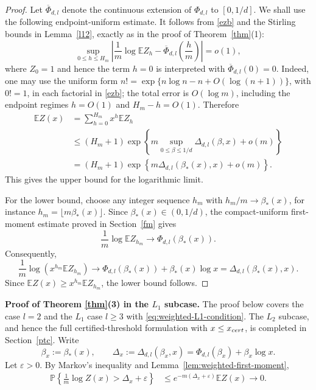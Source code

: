 \documentclass[11pt]{amsart}
\theoremstyle{plain}
\numberwithin{equation}{section}
\numberwithin{theorem}{section}
\numberwithin{figure}{section}
\begin{document}
\begin{proof}
Let $\overline\Phi_{d,l}$ denote the continuous extension of $\Phi_{d,l}$ to
$[0,1/d]$.  We shall use the following endpoint-uniform estimate.  It follows
from \eqref{ezb} and the Stirling bounds in Lemma~\ref{l12}, exactly as in the
proof of Theorem~\ref{thm}(1):
\begin{equation}\label{eq:weighted-crude-first-moment}
  \sup_{0\le h\le H_m}
  \left|
  \frac1m\log \mathbb E Z_h-
  \overline\Phi_{d,l}\left(\frac hm\right)
  \right|=o(1),
\end{equation}
where $Z_0=1$ and hence the term $h=0$ is interpreted with
$\overline\Phi_{d,l}(0)=0$.  Indeed, one may use the uniform form
$n!=\exp\{n\log n-n+O(\log(n+1))\}$, with $0!=1$, in each factorial in
\eqref{ezb}; the total error is $O(\log m)$, including the endpoint regimes
$h=O(1)$ and $H_m-h=O(1)$.  Therefore
\begin{align*}
\mathbb E Z(x)
&=\sum_{h=0}^{H_m}x^h\mathbb E Z_h  \\
&\le (H_m+1)
\exp\left\{m\sup_{0\le\beta\le1/d}
       \Delta_{d,l}(\beta,x)+o(m)\right\}  \\
&=(H_m+1)\exp\left\{m\Delta_{d,l}(\beta_*(x),x)+o(m)\right\} .
\end{align*}
This gives the upper bound for the logarithmic limit.

For the lower bound, choose any integer sequence $h_m$ with
$h_m/m\to\beta_*(x)$, for instance $h_m=\lfloor m\beta_*(x)\rfloor$.
Since $\beta_*(x)\in(0,1/d)$, the compact-uniform first-moment estimate proved
in Section~\ref{fm} gives
\[
  \frac1m\log\mathbb E Z_{h_m}\longrightarrow \Phi_{d,l}(\beta_*(x)).
\]
Consequently,
\[
  \frac1m\log\left(x^{h_m}\mathbb E Z_{h_m}\right)
  \longrightarrow
  \Phi_{d,l}(\beta_*(x))+\beta_*(x)\log x
  =\Delta_{d,l}(\beta_*(x),x).
\]
Since $\mathbb E Z(x)\ge x^{h_m}\mathbb E Z_{h_m}$, the lower bound follows.
\end{proof}

\noindent\textbf{Proof of Theorem \ref{thm}(3) in the $L_1$ subcase.}
The proof below covers the case $l=2$ and the $L_1$ case $l\ge3$ with
\eqref{eq:weighted-L1-condition}.  The $L_2$ subcase, and hence the full
certified-threshold formulation with $x\le x_{\rm cert}$, is completed in
Section~\ref{ptc}.  Write
\[
  \beta_x:=\beta_*(x),\qquad
  \Delta_x:=\Delta_{d,l}(\beta_x,x)
  =\Phi_{d,l}(\beta_x)+\beta_x\log x .
\]
Let $\varepsilon>0$.  By Markov's inequality and Lemma~\ref{lem:weighted-first-moment},
\begin{align}\label{eq:weighted-upper-tail}
\mathbb P\left\{\frac1m\log Z(x)>\Delta_x+\varepsilon\right\}
&\le e^{-m(\Delta_x+\varepsilon)}\mathbb E Z(x)
\longrightarrow 0 .
\end{align}
\end{document}
